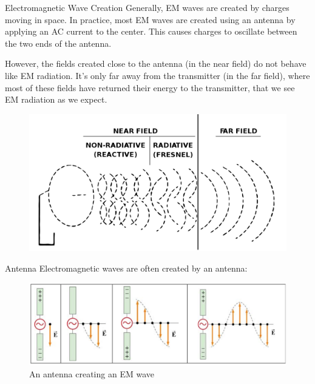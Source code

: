 \documentclass{beamer}
\begin{document}
\begin{frame}{Electromagnetic Wave Creation}
    Generally, EM waves are created by charges moving in space. In practice, most EM waves are created using an antenna by applying an AC current to the center. This causes charges to oscillate between the two ends of the antenna. \vspace{2mm}

    However, the fields created close to the antenna (in the \alert{near field}) do not behave like EM radiation. It's only far away from the transmitter (in the \alert{far field}), where most of these fields have returned their energy to the transmitter, that we see EM radiation as we expect. 
    
    \begin{figure}
        \centering
        \includegraphics[scale=.13]{nearfar.png}
        \label{fig:nearfar}
    \end{figure}
    
\end{frame}

\begin{frame}{Antenna}
    Electromagnetic waves are often created by an antenna:
    \begin{figure}
        \centering
        \includegraphics[scale=.4]{antenna.png}
        \caption{An antenna creating an EM wave}
        \label{fig:antenna}
    \end{figure}
\end{frame}
\end{document}
